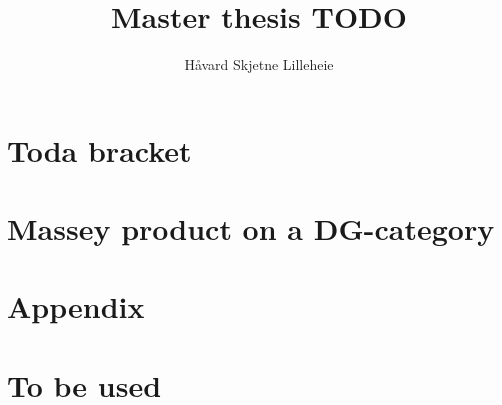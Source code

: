 \documentclass[a4paper, 12pt]{article}
\title{Master thesis TODO}
\author{Håvard Skjetne Lilleheie}
\begin{document}
\maketitle

\tableofcontents

\section{Toda bracket}


\section{Massey product on a DG-category}


\section{Appendix}


\section{To be used}


{}

\end{document}
